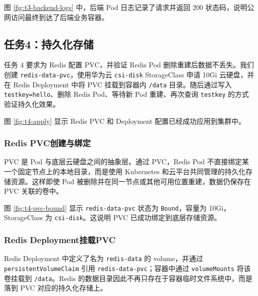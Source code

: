 
图 \ref{fig:t3-backend-logs} 中，后端 Pod 日志记录了请求并返回 200 状态码，说明公网访问最终到达了后端业务容器。

\subsection{任务4：持久化存储}

任务 4 要求为 Redis 配置 PVC，并验证 Redis Pod 删除重建后数据不丢失。我们创建 \verb|redis-data-pvc|，使用华为云 \verb|csi-disk| StorageClass 申请 10Gi 云硬盘，并在 Redis Deployment 中将 PVC 挂载到容器内 \verb|/data| 目录。随后通过写入 \verb|testkey=hello|、删除 Redis Pod、等待新 Pod 重建、再次查询 \verb|testkey| 的方式验证持久化效果。


图 \ref{fig:t4-apply} 显示 Redis PVC 和 Deployment 配置已经成功应用到集群中。

\subsubsection{Redis PVC创建与绑定}

PVC 是 Pod 与底层云硬盘之间的抽象层。通过 PVC，Redis Pod 不直接绑定某一个固定节点上的本地目录，而是使用 Kubernetes 和云平台共同管理的持久化存储资源。这样即使 Pod 被删除并在同一节点或其他可用位置重建，数据仍保存在 PVC 关联的卷中。


图 \ref{fig:t4-pvc-bound} 显示 \verb|redis-data-pvc| 状态为 \verb|Bound|，容量为 10Gi，StorageClass 为 \verb|csi-disk|。这说明 PVC 已成功绑定到底层存储资源。

\subsubsection{Redis Deployment挂载PVC}

Redis Deployment 中定义了名为 \verb|redis-data| 的 volume，并通过 \verb|persistentVolumeClaim| 引用 \verb|redis-data-pvc|；容器中通过 \verb|volumeMounts| 将该卷挂载到 \verb|/data|。Redis 的数据目录因此不再只存在于容器临时文件系统中，而是落到 PVC 对应的持久化存储上。

